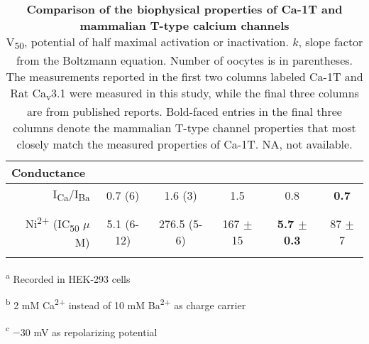 {\begin{table}[ht!]
\begin{center}
\begin{threeparttable}
\begin{tabular}{@{}rccccc@{}}
\multicolumn{1}{l}{{\bf Conductance}} &  &  &  &  &  \\ \midrule \addlinespace
I\textsubscript{Ca}/I\textsubscript{Ba} & 0.7 (6) & 1.6 (3) & 1.5\cite{shcheglovitov:2007aa} & 0.8\cite{shcheglovitov:2007aa} & {\bf 0.7\cite{shcheglovitov:2007aa}} \\ \addlinespace \addlinespace
\multicolumn{1}{l}{{\bf Pharmacology}} &  &  &  &  &  \\ \midrule \addlinespace
Ni\textsuperscript{2+} (IC\textsubscript{50} $\mu$M) & 5.1 (6-12) & 276.5 (5-6) & 167 $\pm$ 15\cite{lee:1999ab}\tnote{c} & {\bf 5.7 $\pm$ 0.3\cite{lee:1999ab}\tnote{c}} & 87 $\pm$ 7\cite{lee:1999ab}\tnote{c} \\ \addlinespace 
\end{tabular}
    \begin{tablenotes}
        \begin{flushleft}
        \item[\textsuperscript{a}] Recorded in HEK-293 cells
        \item[\textsuperscript{b}] 2 mM Ca\textsuperscript{2+} instead of 10 mM Ba\textsuperscript{2+} as charge carrier
        \item[\textsuperscript{c}] $-$30 mV as repolarizing potential
        \end{flushleft}
    \end{tablenotes}
\end{threeparttable}
\end{center}
\caption{
{\bf Comparison of the biophysical properties of Ca-\alpha1T and mammalian T-type calcium channels}
\\
V\textsubscript{50}, potential of half maximal activation or inactivation.
$k$, slope factor from the Boltzmann equation.
Number of oocytes is in parentheses.
The measurements reported in the first two columns labeled Ca-\alpha1T and Rat Ca\textsubscript{v}3.1 were measured in this study, while the final three columns are from published reports.
Bold-faced entries in the final three columns denote the mammalian T-type channel properties that most closely match the measured properties of Ca-\alpha1T.
NA, not available.}
\label{tab:1}
\end{table}
}